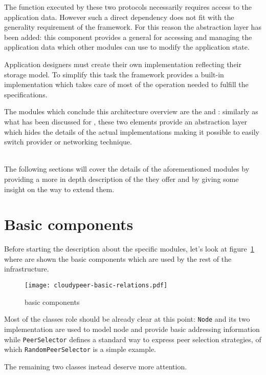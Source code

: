 The function executed by these two protocols necessarily requires
access to the application data. However such a direct dependency
does not fit with
the generality requirement of the framework. For this reason the
\store abstraction layer has been added: this component provides a general
\api for accessing and managing the application data which other
modules can use to modify the application state.

Application designers must create their own \store implementation
reflecting their storage model. To simplify this task the framework
provides a built-in implementation which takes care of most of the
operation needed to fulfill the \api specifications.

The modules which conclude this architecture overview are the
\cloudhelper and \networkhelper: similarly as what has been discussed for
\grapes, these two elements provide an abstraction layer which hides
the details of the actual implementations making it possible
to easily switch \cloud provider or networking technique.

\ \\
The following sections will cover the details of the aforementioned
modules by providing a more in depth description of the \api they
offer and by giving some insight on the way to extend them.

\section{Basic components}
Before starting the description about the specific modules, let's look
at figure~\ref{fig:cloudypeer-basic-relations} where are shown the
basic components which are used by the rest of the \cloudypeer
infrastructure.

\begin{figure}[h!]
  \centering
  \texttt{[image: cloudypeer-basic-relations.pdf]}
  \caption{\cloudypeer basic components}
  \label{fig:cloudypeer-basic-relations}
\end{figure}

Most of the classes role should be already clear at this point:
\texttt{Node} and its two implementation are used to model
node \descriptors and provide basic addressing information while
\texttt{PeerSelector} defines a standard way to express
peer selection strategies, of which \texttt{RandomPeerSelector} is a
simple example.

The remaining two classes instead deserve more attention.


